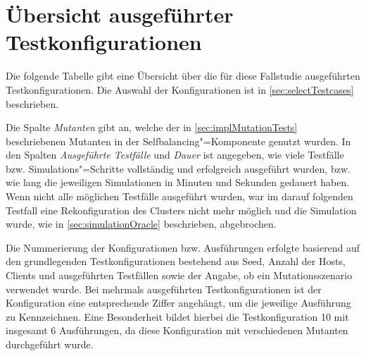 \chapter{Übersicht ausgeführter Testkonfigurationen}
\label{app:overviewExecutedTestCases}

Die folgende Tabelle gibt eine Übersicht über die für diese Fallstudie ausgeführten Testkonfigurationen.
Die Auswahl der Konfigurationen ist in \autoref{sec:selectTestcases} beschrieben.

Die Spalte \emph{Mutanten} gibt an, welche der in \autoref{sec:implMutationTests} beschriebenen Mutanten in der Selfbalancing"=Komponente genutzt wurden.
In den Spalten \emph{Ausgeführte Testfälle} und \emph{Dauer} ist angegeben, wie viele Testfälle bzw. Simulations"=Schritte vollständig und erfolgreich ausgeführt wurden, bzw. wie lang die jeweiligen Simulationen in Minuten und Sekunden gedauert haben.
Wenn nicht alle möglichen Testfälle ausgeführt wurden, war im darauf folgenden Testfall eine Rekonfiguration des Clusters nicht mehr möglich und die Simulation wurde, wie in \autoref{sec:simulationOracle} beschrieben, abgebrochen.

Die Nummerierung der Konfigurationen bzw. Ausführungen erfolgte basierend auf den grundlegenden Testkonfigurationen bestehend aus Seed, Anzahl der Hosts, Clients und ausgeführten Testfällen sowie der Angabe, ob ein Mutationsszenario verwendet wurde.
Bei mehrmals ausgeführten Testkonfigurationen ist der Konfiguration eine entsprechende Ziffer angehängt, um die jeweilige Ausführung zu Kennzeichnen.
Eine Besonderheit bildet hierbei die Testkonfiguration 10 mit insgesamt 6 Ausführungen, da diese Konfiguration mit verschiedenen Mutanten durchgeführt wurde.

